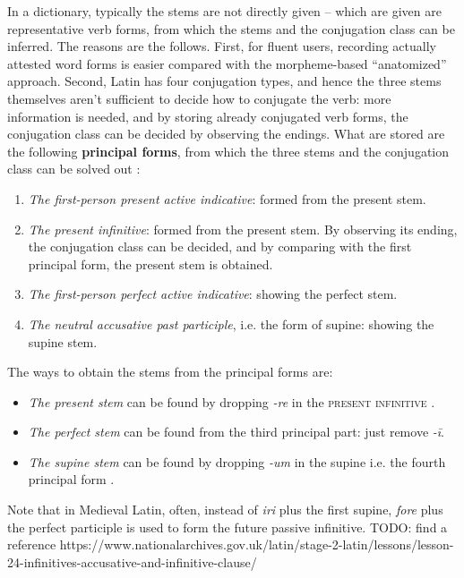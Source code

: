 \documentclass[a4paper, oneside, 12pt]{report}
\newcommand*{\citesec}[1]{\S~{#1}}
\newcommand*{\concept}[1]{\textbf{#1}}
\newcommand{\form}[1]{\emph{#1}}
\newcommand*{\category}[1]{\textsc{#1}}
\begin{document}
In a dictionary, 
typically the stems are not directly given 
-- which are given are representative verb forms,
from which the stems and the conjugation class can be inferred.
The reasons are the follows.
First, for fluent users,
recording actually attested word forms is easier
compared with the morpheme-based ``anatomized'' approach.
Second, Latin has four conjugation types,
and hence the three stems themselves aren't sufficient to decide how to conjugate the verb:
more information is needed, 
and by storing already conjugated verb forms,
the conjugation class can be decided by observing the endings.
What are stored are the following \concept{principal forms},
from which the three stems and the conjugation class can be solved out
\citep[\citesec{172}]{allen1903allen}:
\begin{enumerate}
    \item \emph{The first-person present active indicative}: formed from the present stem.
    \item \emph{The present infinitive}: formed from the present stem. 
    By observing its ending, the conjugation class can be decided,
    and by comparing with the first principal form, 
    the present stem is obtained.
    \item \emph{The first-person perfect active indicative}: showing the perfect stem.
    \item \emph{The neutral accusative past participle}, i.e. the form of supine: showing the supine stem.
\end{enumerate}
The ways to obtain the stems from the principal forms are:
\begin{itemize}
    \item \emph{The present stem} can be found by dropping \form{-re} in the 
    \category{present infinitive}
    \citep[\citesec{175}]{allen1903allen}.
    \item \emph{The perfect stem} can be found from the third principal part:
    just remove \form{-ī}.
    \item \emph{The supine stem} can be found by dropping \form{-um} in the supine
    i.e. the fourth principal form
    \citep[\citesec{178}]{allen1903allen}.
\end{itemize}

Note that in Medieval Latin, often,
instead of \form{iri} plus the first supine,
\form{fore} plus the perfect participle is used to form the future passive infinitive.
TODO: find a reference https://www.nationalarchives.gov.uk/latin/stage-2-latin/lessons/lesson-24-infinitives-accusative-and-infinitive-clause/
\end{document}
